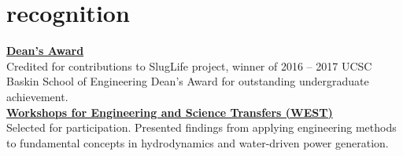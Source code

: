 \documentclass[]{./friggeri-cv}
\begin{document}
\section{recognition}
    {\href{http://honors.ucsc.edu/awards/dca/index.html}{\bf Dean's Award}}\\
    Credited for contributions to SlugLife project, winner of
    2016 -- 2017 UCSC Baskin School of Engineering Dean's Award for outstanding
    undergraduate achievement.\newline\\
    {\href{http://isee.ucsc.edu/programs/west/index.html}%
    {\bf Workshops for Engineering and Science Transfers (WEST)}}\\
    {Selected for participation. Presented findings from applying 
    engineering methods to fundamental concepts in hydrodynamics and 
    water-driven power generation.}
\end{document}
